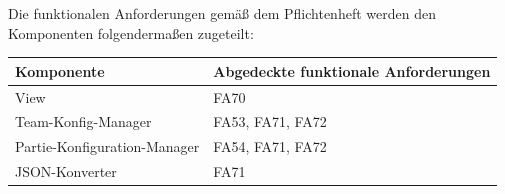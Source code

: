 Die funktionalen Anforderungen gemäß dem Pflichtenheft werden den Komponenten folgendermaßen zugeteilt:

\begin{table}[h]
    \centering
    \begin{tabular}{|l|l|}
        \hline
        \textbf{Komponente} & \textbf{Abgedeckte funktionale Anforderungen}\\ \hline 
        
        View & FA70   \\ \hline     
        
        Team-Konfig-Manager & FA53, FA71, FA72 \\ \hline

        Partie-Konfiguration-Manager & FA54, FA71, FA72 \\ \hline

        JSON-Konverter & FA71 \\ \hline


    \end{tabular}
\end{table}
